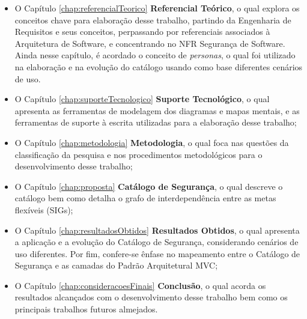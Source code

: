 \begin{itemize}
	\item O Capítulo \ref{chap:referencialTeorico} \textbf{Referencial Teórico}, o qual explora os conceitos chave para elaboração desse trabalho, partindo da Engenharia de Requisitos e seus conceitos, perpassando por referenciais associados à Arquitetura de Software, e concentrando no NFR Segurança de Software. Ainda nesse capítulo, é acordado o conceito de \textit{personas}, o qual foi utilizado na elaboração e na evolução do catálogo usando como base diferentes cenários de uso.
	
	\item  O Capítulo \ref{chap:suporteTecnologico} \textbf{Suporte Tecnológico}, o qual apresenta as ferramentas de modelagem dos diagramas e mapas mentais, e as ferramentas de suporte à escrita utilizadas para a elaboração desse trabalho;
	
	\item O Capítulo \ref{chap:metodologia} \textbf{Metodologia}, o qual foca nas questões da classificação da pesquisa e nos procedimentos metodológicos para o desenvolvimento desse trabalho;
	
	\item O Capítulo \ref{chap:proposta} \textbf{Catálogo de Segurança}, o qual descreve o catálogo bem como detalha o grafo de interdependência entre as metas flexíveis (SIGs);
	
	\item  O Capítulo  \ref{chap:resultadosObtidos} \textbf{Resultados Obtidos}, o qual apresenta a aplicação e a evolução do Catálogo de Segurança, considerando cenários de uso diferentes. Por fim, confere-se ênfase no mapeamento entre o Catálogo de Segurança e as camadas do Padrão Arquitetural MVC;
	
	\item  O Capítulo \ref{chap:consideracoesFinais} \textbf{Conclusão}, o qual acorda os resultados alcançados com o desenvolvimento desse trabalho bem como os principais trabalhos futuros almejados. 
\end{itemize}

